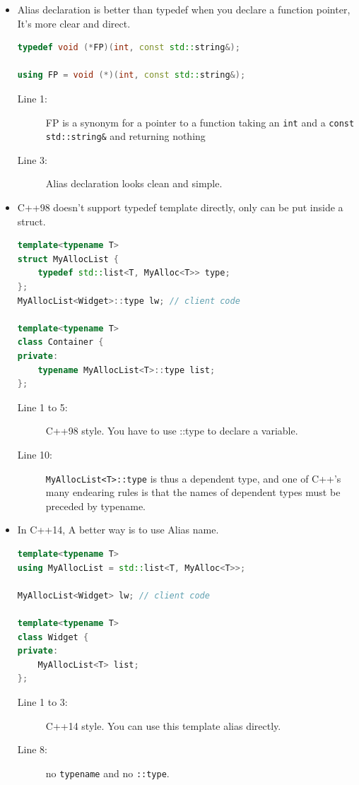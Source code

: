 \documentclass[a4paper,11pt,twoside]{book}
\begin{document}
\begin{itemize}
\item Alias declaration is better than typedef when you declare a function pointer, It's more clear and direct.
\begin{lstlisting}[frame=single, language=c++]
typedef void (*FP)(int, const std::string&);

using FP = void (*)(int, const std::string&);
\end{lstlisting}
\begin{description}
	\item[Line 1:] FP is a synonym for a pointer to a function taking an \texttt{int} and a \texttt{const std::string\&} and returning nothing
	\item[Line 3:] Alias declaration looks clean and simple.
\end{description}

\item C++98 doesn't support typedef template directly, only can be put inside a struct.
\begin{lstlisting}[frame=single, language=c++]
template<typename T>
struct MyAllocList {
	typedef std::list<T, MyAlloc<T>> type;
};
MyAllocList<Widget>::type lw; // client code

template<typename T>
class Container { 
private:
	typename MyAllocList<T>::type list; 
};
\end{lstlisting}
\begin{description}
	\item[Line 1 to 5:] C++98 style. You have to use ::type to declare a variable.
	\item[Line 10:] \texttt{MyAllocList<T>::type} is thus a dependent type, and one of C++'s many endearing rules is that the names of dependent types must be preceded by typename.
\end{description}


\item In C++14, A better way is to use Alias name.
\begin{lstlisting}[frame=single, language=c++]
template<typename T> 
using MyAllocList = std::list<T, MyAlloc<T>>;

MyAllocList<Widget> lw; // client code

template<typename T>
class Widget {
private:
	MyAllocList<T> list; 
};
\end{lstlisting}


\begin{description}
	\item[Line 1 to 3:] C++14 style. You can use this template alias directly.
	\item[Line 8:] no \texttt{typename} and no \texttt{::type}.
\end{description}


\end{itemize}
\end{document}
